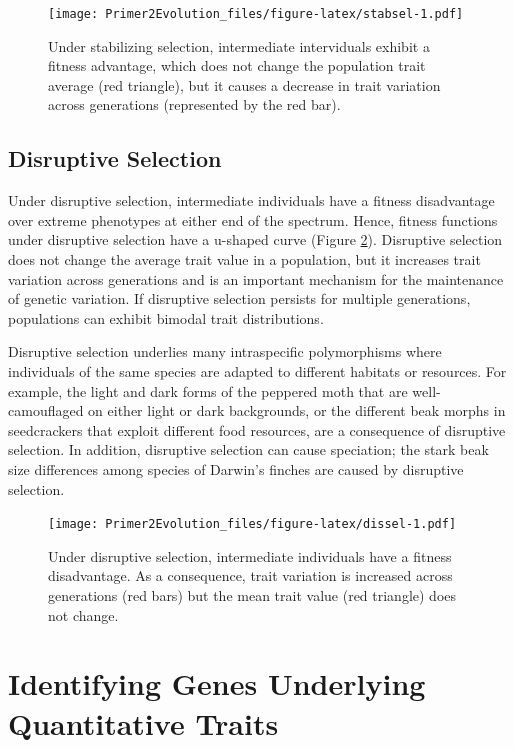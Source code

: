 \documentclass[
]{book}
\begin{document}
\begin{figure}
\centering
\texttt{[image: Primer2Evolution\_files/figure-latex/stabsel-1.pdf]}
\caption{\label{fig:stabsel}Under stabilizing selection, intermediate interviduals exhibit a fitness advantage, which does not change the population trait average (red triangle), but it causes a decrease in trait variation across generations (represented by the red bar).}
\end{figure}

\hypertarget{disruptive-selection}{%
\subsection{Disruptive Selection}\label{disruptive-selection}}

Under disruptive selection, intermediate individuals have a fitness disadvantage over extreme phenotypes at either end of the spectrum. Hence, fitness functions under disruptive selection have a u-shaped curve (Figure \ref{fig:dissel}). Disruptive selection does not change the average trait value in a population, but it increases trait variation across generations and is an important mechanism for the maintenance of genetic variation. If disruptive selection persists for multiple generations, populations can exhibit bimodal trait distributions.

Disruptive selection underlies many intraspecific polymorphisms where individuals of the same species are adapted to different habitats or resources. For example, the light and dark forms of the peppered moth that are well-camouflaged on either light or dark backgrounds, or the different beak morphs in seedcrackers that exploit different food resources, are a consequence of disruptive selection. In addition, disruptive selection can cause speciation; the stark beak size differences among species of Darwin's finches are caused by disruptive selection.

\begin{figure}
\centering
\texttt{[image: Primer2Evolution\_files/figure-latex/dissel-1.pdf]}
\caption{\label{fig:dissel}Under disruptive selection, intermediate individuals have a fitness disadvantage. As a consequence, trait variation is increased across generations (red bars) but the mean trait value (red triangle) does not change.}
\end{figure}

\hypertarget{identifying-genes-underlying-quantitative-traits}{%
\section{Identifying Genes Underlying Quantitative Traits}\label{identifying-genes-underlying-quantitative-traits}}
\end{document}
